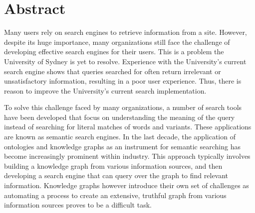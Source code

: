 

\chapter*{Abstract} Many users rely on search engines to retrieve information from a site. However, despite its huge importance, many organizations still face the challenge of developing effective search engines for their users. This is a problem the University of Sydney is yet to resolve. Experience with the University’s current search engine shows that queries searched for often return irrelevant or unsatisfactory information, resulting in a poor user experience. Thus, there is reason to improve the University’s current search implementation.

To solve this challenge faced by many organizations, a number of search tools have been developed that focus on understanding the meaning of the query instead of searching for literal matches of words and variants. These applications are known as semantic search engines. In the last decade, the application of ontologies and knowledge graphs as an instrument for semantic searching has become increasingly prominent within industry. This approach typically involves building a knowledge graph from various information sources, and then developing a search engine that can query over the graph to find relevant information. Knowledge graphs however introduce their own set of challenges as automating a process to create an extensive, truthful graph from various information sources proves to be a difficult task.
